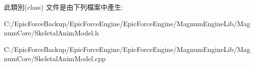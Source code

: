 此類別(class) 文件是由下列檔案中產生\+:\begin{DoxyCompactItemize}
\item 
C\+:/\+Epic\+Force\+Backup/\+Epic\+Force\+Engine/\+Epic\+Force\+Engine/\+Magnum\+Engine\+Lib/\+Magnum\+Core/Skeletal\+Anim\+Model.\+h\item 
C\+:/\+Epic\+Force\+Backup/\+Epic\+Force\+Engine/\+Epic\+Force\+Engine/\+Magnum\+Engine\+Lib/\+Magnum\+Core/Skeletal\+Anim\+Model.\+cpp\end{DoxyCompactItemize}
